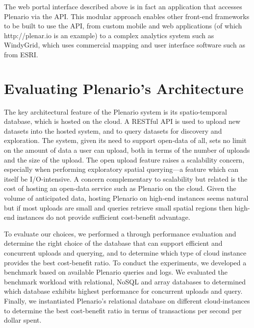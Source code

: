 \documentclass[11pt]{article}
\begin{document}
The web portal interface described above is in fact an application that accesses Plenario via the API. This modular approach enables other front-end frameworks to be built to use the API, from custom mobile and web applications (of which http://plenar.io is an example) to a complex analytics system such as WindyGrid, which uses commercial mapping and user interface software such as from ESRI.

\section{Evaluating Plenario's Architecture}
The key architectural feature of the Plenario system is its spatio-temporal database, which is hosted on the cloud. A RESTful API is used to upload new datasets into the hosted system, and to query datasets for discovery and exploration. The system, given its need to support open-data of all, sets no limit on the amount of data a user can upload, both in terms of  the number of uploads and the size of the upload. The open upload feature raises a scalability concern, especially when performing exploratory spatial querying---a feature which can itself be I/O-intensive. A concern complementary to scalability but related is the cost of hosting an open-data service such as Plenario on the cloud. Given the volume of anticipated data, hosting Plenario on high-end instances seems natural but if most uploads are small and queries retrieve small spatial regions then high-end instances do not provide sufficient cost-benefit advantage. 

To evaluate our choices, we performed a through performance evaluation and determine the right choice of the database that can support efficient and concurrent uploads and querying, and to determine which type of cloud instance provides the best cost-benefit ratio. To conduct the experiments, we developed a benchmark based on available Plenario queries and logs. We evaluated the benchmark workload with relational, NoSQL and array databases to determined which database exhibits highest performance for concurrent uploads and query. Finally, we instantiated Plenario's relational database on different cloud-instances to determine the best cost-benefit ratio in terms of transactions per second per dollar spent.

\end{document}
